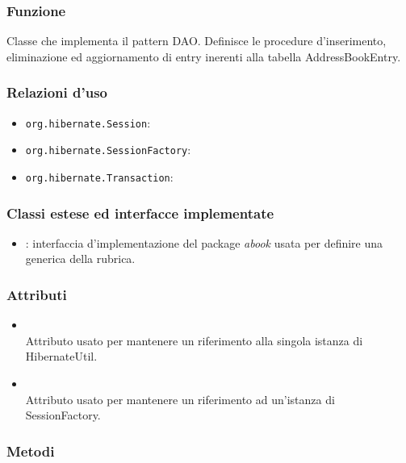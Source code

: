 

\subsubsection*{Funzione}
Classe che implementa il pattern DAO. Definisce le procedure d'inserimento, eliminazione ed aggiornamento di entry inerenti alla tabella AddressBookEntry.

\subsubsection*{Relazioni d'uso}

\begin{itemize}
	\item \texttt{org.hibernate.Session}:
	\item \texttt{org.hibernate.SessionFactory}:
	\item \texttt{org.hibernate.Transaction}:
\end{itemize}

\subsubsection*{Classi estese ed interfacce implementate}
\begin{itemize}
	\item {}: interfaccia d'implementazione del package \textit{abook} usata per definire una generica  della rubrica.
\end{itemize}

\subsubsection*{Attributi}

\begin{itemize}
	\item{}\\
	Attributo usato per mantenere un riferimento alla singola istanza di HibernateUtil.
	\item{}\\
	Attributo usato per mantenere un riferimento ad un'istanza di SessionFactory.
\end{itemize}

\subsubsection*{Metodi}

